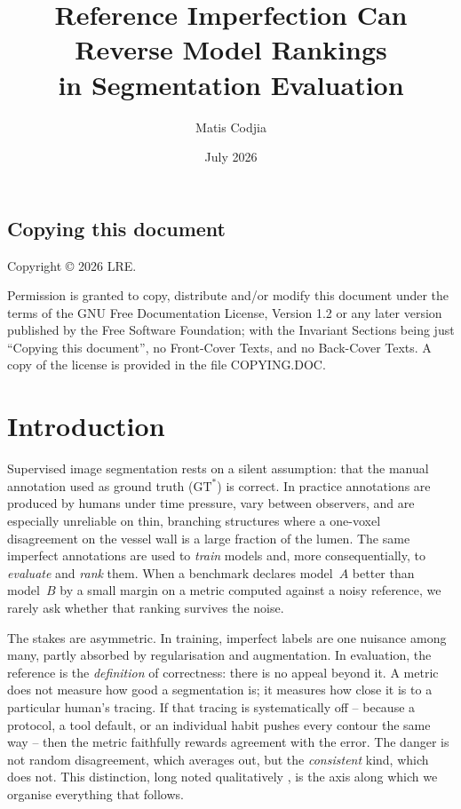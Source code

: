 \documentclass[
    bookmarks, bookmarksnumbered, bookmarksopen,
    colorlinks=true, citecolor=blue, linkcolor=blue, urlcolor=blue
]{techrep}
\title{Reference Imperfection Can Reverse Model Rankings\\
in Segmentation Evaluation}
\author{Matis Codjia}
\date{July 2026}
\newcommand{\gtstar}{\ensuremath{\mathrm{GT}^{\!*}}}
\begin{document}
\maketitle

\section*{Copying this document}
Copyright \copyright{} 2026 LRE.

Permission is granted to copy, distribute and/or modify this document under the terms of the
GNU Free Documentation License, Version 1.2 or any later version published by the Free Software
Foundation; with the Invariant Sections being just ``Copying this document'', no Front-Cover
Texts, and no Back-Cover Texts. A copy of the license is provided in the file COPYING.DOC.

\tableofcontents
\newpage





\chapter{Introduction}
Supervised image segmentation rests on a silent assumption: that the manual
annotation used as ground truth (\gtstar) is correct. In practice annotations are
produced by humans under time pressure, vary between observers, and are especially
unreliable on thin, branching structures where a one-voxel disagreement on the vessel
wall is a large fraction of the lumen. The same imperfect annotations are used to
\emph{train} models and, more consequentially, to \emph{evaluate} and \emph{rank}
them. When a benchmark declares model~$A$ better than model~$B$ by a small margin on
a metric computed against a noisy reference, we rarely ask whether that ranking
survives the noise.

The stakes are asymmetric. In training, imperfect labels are one nuisance among many,
partly absorbed by regularisation and augmentation. In evaluation, the reference is the
\emph{definition} of correctness: there is no appeal beyond it. A metric does not measure
how good a segmentation is; it measures how close it is to a particular human's tracing.
If that tracing is systematically off -- because a protocol, a tool default, or an
individual habit pushes every contour the same way -- then the metric faithfully rewards
agreement with the error. The danger is not random disagreement, which averages out, but
the \emph{consistent} kind, which does not. This distinction, long noted qualitatively
\cite{heller2018imperfect}, is the axis along which we organise everything that follows.
\end{document}
